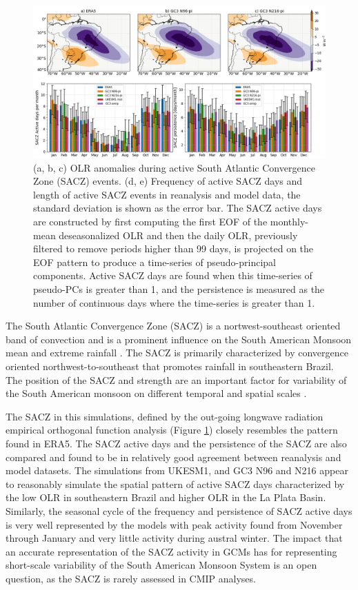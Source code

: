 \begin{figure}[t!]
\includegraphics[width=\linewidth]{figures/saczanalysis.png}
\caption{(a, b, c) OLR anomalies during active South Atlantic Convergence Zone (SACZ) events. (d, e) Frequency of active SACZ days and length of active SACZ events in reanalysis and model data, the standard deviation is shown as the error bar. The SACZ active days are constructed by first computing the first EOF of the monthly-mean deseasonalized OLR and then the daily OLR, previously filtered to remove periods higher than 99 days, is projected on the EOF pattern to produce a time-series of pseudo-principal components. Active SACZ days are found when this time-series of pseudo-PCs is greater than 1, and the persistence is measured as the number of continuous days where the time-series is greater than 1.}
\label{fig:sacz}
\end{figure}

 The South Atlantic Convergence Zone (SACZ) is a nortwest-southeast oriented band of convection and is a prominent influence on the South American Monsoon mean and extreme rainfall \citep{carvalho2004,marengo2012,jorgetti2014}. The SACZ is primarily characterized by convergence oriented northwest-to-southeast that promotes rainfall in southeastern Brazil. The position of the SACZ and strength are an important factor for variability of the South American monsoon on different temporal and spatial scales \citep{carvalho2004,marengo2012,jorgetti2014}. 
 
 The SACZ in this simulations, defined by the out-going longwave radiation empirical orthogonal function analysis (Figure \ref{fig:sacz}) closely resembles the pattern found in ERA5. The SACZ active days and the persistence of the SACZ are also compared and found to be in relatively good agreement between reanalysis and model datasets.
The simulations from UKESM1, and GC3 N96 and N216 appear to reasonably simulate the spatial pattern of active SACZ days characterized by the low OLR in southeastern Brazil and higher OLR in the La Plata Basin. Similarly, the seasonal cycle of the frequency and persistence of SACZ active days is very well represented by the models with peak activity found from November through January and very little activity during austral winter. The impact that an accurate representation of the SACZ activity in GCMs has for representing short-scale variability of the South American Monsoon System is an open question, as the SACZ is rarely assessed in CMIP analyses.




